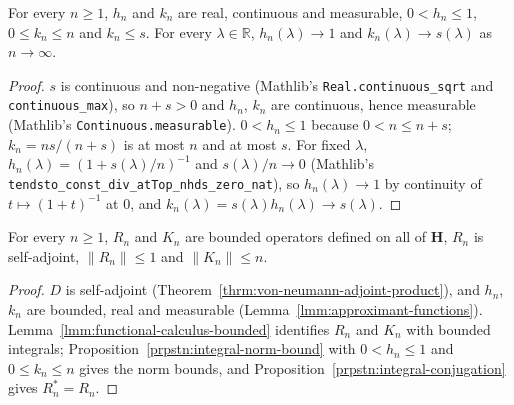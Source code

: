 \begin{lemma}
    \label{lmm:approximant-functions}
    \leanok
    For every $n \ge 1$, $h_n$ and $k_n$ are real, continuous and measurable, $0 < h_n \le 1$, $0 \le k_n \le n$ and $k_n \le s$. For every $\lambda \in \mathbb{R}$, $h_n(\lambda) \to 1$ and $k_n(\lambda) \to s(\lambda)$ as $n \to \infty$.
\end{lemma}
\begin{proof}
    \leanok
    $s$ is continuous and non-negative (Mathlib's \texttt{Real.continuous\_sqrt} and \texttt{continuous\_max}), so $n + s > 0$ and $h_n$, $k_n$ are continuous, hence measurable (Mathlib's \texttt{Continuous.measurable}). $0 < h_n \le 1$ because $0 < n \le n + s$; $k_n = ns/(n + s)$ is at most $n$ and at most $s$. For fixed $\lambda$, $h_n(\lambda) = (1 + s(\lambda)/n)^{-1}$ and $s(\lambda)/n \to 0$ (Mathlib's \texttt{tendsto\_const\_div\_atTop\_nhds\_zero\_nat}), so $h_n(\lambda) \to 1$ by continuity of $t \mapsto (1 + t)^{-1}$ at $0$, and $k_n(\lambda) = s(\lambda)h_n(\lambda) \to s(\lambda)$.
\end{proof}

\begin{lemma}
    \label{lmm:approximant-bounded}
    \leanok
    For every $n \ge 1$, $R_n$ and $K_n$ are bounded operators defined on all of $\mathbf{H}$, $R_n$ is self-adjoint, $\|R_n\| \le 1$ and $\|K_n\| \le n$.
\end{lemma}
\begin{proof}
    \leanok
    $D$ is self-adjoint (Theorem~\ref{thrm:von-neumann-adjoint-product}), and $h_n$, $k_n$ are bounded, real and measurable (Lemma~\ref{lmm:approximant-functions}). Lemma~\ref{lmm:functional-calculus-bounded} identifies $R_n$ and $K_n$ with bounded integrals; Proposition~\ref{prpstn:integral-norm-bound} with $0 < h_n \le 1$ and $0 \le k_n \le n$ gives the norm bounds, and Proposition~\ref{prpstn:integral-conjugation} gives $R_n^* = R_n$.
\end{proof}


